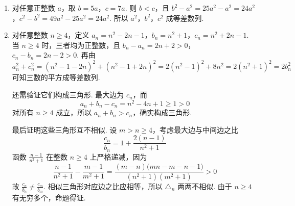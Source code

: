 \begin{solution}
\begin{enumerate}
\item 对任意正整数 \(a\)，取
\(b=5a\)，\(c=7a\).
则 \(b<c\)，且
\(b^2-a^2=25a^2-a^2=24a^2\)，\(c^2-b^2=49a^2-25a^2=24a^2\).
所以 \(a^2\)，\(b^2\)，\(c^2\) 成等差数列.
\item 对任意整数 \(n\geqslant4\)，定义
\(a_n=n^2-2n-1\)，\(b_n=n^2+1\)，\(c_n=n^2+2n-1\).
当 \(n\geqslant4\) 时，三者均为正整数，且
\(b_n-a_n=2n+2>0\)，\(c_n-b_n=2n-2>0\).
再由
\[
a_n^2+c_n^2
=(n^2-1-2n)^2+(n^2-1+2n)^2
=2(n^2-1)^2+8n^2
=2(n^2+1)^2=2b_n^2
\]
可知三数的平方成等差数列.

还需验证它们构成三角形. 最大边为 \(c_n\)，而
\[
a_n+b_n-c_n=n^2-4n+1\geqslant1>0
\]
对所有 \(n\geqslant4\) 成立，所以 \(a_n+b_n>c_n\)，确实构成三角形.

最后证明这些三角形互不相似. 设 \(m>n\geqslant4\)，考虑最大边与中间边之比
\[
\frac{c_n}{b_n}=1+\frac{2(n-1)}{n^2+1}
\]
函数 \(\frac{n-1}{n^2+1}\) 在整数 \(n\geqslant4\) 上严格递减，因为
\[
\frac{n-1}{n^2+1}-\frac{m-1}{m^2+1}
=\frac{(m-n)\bigl(mn-m-n-1\bigr)}{(n^2+1)(m^2+1)}>0
\]
故 \(\frac{c_n}{b_n}\neq\frac{c_m}{b_m}\). 相似三角形对应边之比应相等，所以 \(\triangle_n\) 两两不相似. 由于 \(n\geqslant4\) 有无穷多个，命题得证.
\end{enumerate}
\end{solution}
